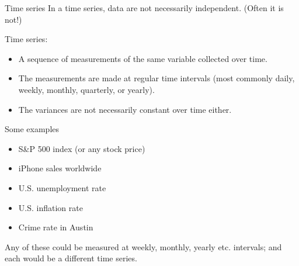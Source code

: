 \documentclass{beamer}\usepackage[]{graphicx}\usepackage[]{color}
\makeatletter
\newcommand{\hlnum}[1]{\textcolor[rgb]{0.824,0.412,0.118}{#1}}%
\newcommand{\hlcom}[1]{\textcolor[rgb]{0.824,0.706,0.549}{#1}}%
\newcommand{\hlopt}[1]{\textcolor[rgb]{1,0.894,0.769}{#1}}%
\newcommand{\hlstd}[1]{\textcolor[rgb]{1,0.894,0.769}{#1}}%
\newcommand{\hlkwb}[1]{\textcolor[rgb]{0.804,0.776,0.451}{#1}}%
\newcommand{\hlkwc}[1]{\textcolor[rgb]{0.78,0.941,0.545}{#1}}%
\newcommand{\hlkwd}[1]{\textcolor[rgb]{1,0.78,0.769}{#1}}%
\newenvironment{kframe}{%
 \def\at@end@of@kframe{}%
 \ifinner\ifhmode%
  \def\at@end@of@kframe{\end{minipage}}%
  \begin{minipage}{\columnwidth}%
 \fi\fi%
 \def\FrameCommand##1{\hskip\@totalleftmargin \hskip-\fboxsep
 \colorbox{shadecolor}{##1}\hskip-\fboxsep
     \hskip-\linewidth \hskip-\@totalleftmargin \hskip\columnwidth}%
 \MakeFramed {\advance\hsize-\width
   \@totalleftmargin\z@ \linewidth\hsize
   \@setminipage}}%
 {\par\unskip\endMakeFramed%
 \at@end@of@kframe}
\newenvironment{knitrout}{}{} %
\makeatother
\begin{document}
\begin{darkframes}
    \begin{frame}{Time series}
      In a \alert{time series,} data are not necessarily independent. (Often it is not!) \pause
      \bigskip

      Time series:
      \begin{itemize}
        \item A sequence of measurements of the same variable collected over time.
        \item The measurements are made at regular time intervals (most commonly daily, weekly, monthly, quarterly, or yearly).
        \item The variances are not necessarily constant over time either.
      \end{itemize}
    \end{frame}



    \begin{frame}{Some examples}
      \begin{itemize}
        \item S\&P 500 index (or any stock price)
        \item iPhone sales worldwide
        \item U.S. unemployment rate
        \item U.S. inflation rate
        \item Crime rate in Austin
      \end{itemize} \pause
      \bigskip
      Any of these could be measured at weekly, monthly, yearly etc. intervals; and each would be a different time series.
    \end{frame}






\end{darkframes}
\end{document}
